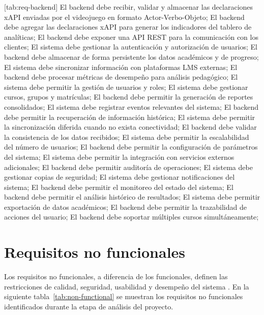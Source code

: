 [tab:req-backend]{
	El backend debe recibir, validar y almacenar las declaraciones xAPI enviadas por el videojuego en formato Actor-Verbo-Objeto;
	El backend debe agregar las declaraciones xAPI para generar los indicadores del tablero de analíticas;
	El backend debe exponer una API REST para la comunicación con los clientes;
	El sistema debe gestionar la autenticación y autorización de usuarios;
	El backend debe almacenar de forma persistente los datos académicos y de progreso;
	El sistema debe sincronizar información con plataformas LMS externas;
	El backend debe procesar métricas de desempeño para análisis pedagógico;
	El sistema debe permitir la gestión de usuarios y roles;
	El sistema debe gestionar cursos, grupos y matrículas;
	El backend debe permitir la generación de reportes consolidados;
	El sistema debe registrar eventos relevantes del sistema;
	El backend debe permitir la recuperación de información histórica;
	El sistema debe permitir la sincronización diferida cuando no exista conectividad;
	El backend debe validar la consistencia de los datos recibidos;
	El sistema debe permitir la escalabilidad del número de usuarios;
	El backend debe permitir la configuración de parámetros del sistema;
	El sistema debe permitir la integración con servicios externos adicionales;
	El backend debe permitir auditoría de operaciones;
	El sistema debe gestionar copias de seguridad;
	El sistema debe gestionar notificaciones del sistema;
	El backend debe permitir el monitoreo del estado del sistema;
	El backend debe permitir el análisis histórico de resultados;
	El sistema debe permitir exportación de datos académicos;
	El backend debe permitir la trazabilidad de acciones del usuario;
	El backend debe soportar múltiples cursos simultáneamente;
}

\section{Requisitos no funcionales}

Los requisitos no funcionales, a diferencia de los funcionales, definen las restricciones de calidad, seguridad, usabilidad y desempeño del sistema  \cite{sommerville_software_2011,pressman_ingenierisoftware_2013}. En la siguiente tabla~\ref{tab:non-functional} se muestran los requisitos no funcionales identificados durante la etapa de análisis del proyecto.

